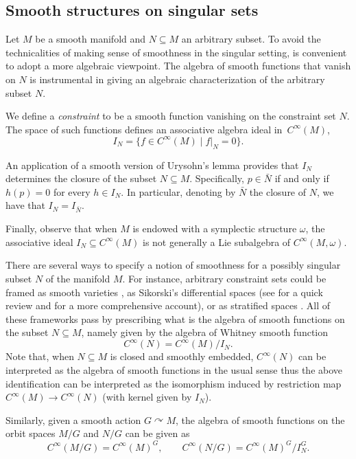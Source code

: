 \documentclass[pdftex]{sigma}
\numberwithin{equation}{section}
\DeclareMathOperator{\action}{\curvearrowright}
\renewcommand{\subset}{\subseteq}
\begin{document}
\subsection{Smooth structures on singular sets}%

Let $M$ be a smooth manifold and $N\subset M$ an arbitrary subset.
To avoid the technicalities of making sense of smoothness in the singular setting, is convenient to adopt a more algebraic viewpoint.
The algebra of smooth functions that vanish on $N$ is instrumental in giving an algebraic characterization of the arbitrary subset $N$.

\begin{Definition}\label{def:constraintideal}
	We define a \emph{constraint} to be a smooth function vanishing on the constraint set $N$.
	The space of such functions defines an associative algebra ideal in~$C^\infty(M)$,
	\[
		I_N	= 	\{
					f \in C^\infty(M)
				\mid
					f|_N = 0
			 	\}.
	\]
\end{Definition}

An application of a smooth version of Urysohn's lemma provides that $I_N$ determines the closure of the subset $N\subset M$.
Specifically, $p \in \bar{N}$ if and only if $h(p)=0$ for every $h \in I_N$.
In particular, denoting by $\bar{N}$ the closure of $N$, we have that $I_N=I_{\bar N}$.

Finally, observe that when $M$ is endowed with a symplectic structure $\omega$, the associative ideal $I_N\subset C^\infty(M)$ is not generally a Lie subalgebra of $C^\infty(M,\omega)$.

\begin{Remark}\label{rem:generalizedSmootheology}
	There are several ways to specify a notion of smoothness for a possibly singular subset $N$ of the manifold $M$.
For instance, arbitrary constraint sets could be framed as smooth varieties \cite[Section~6]{ArmsCushmanGotay91}, as Sikorski's differential spaces \cite{Sikorski72,Sikorski72a} (see \cite[Section~3]{CushmanSniatycki01} for a quick review and \cite{Stacey08} for a more comprehensive account), or as stratified spaces \cite{SjamaarLerman91}.
	All of these frameworks pass by prescribing what is the algebra of smooth functions on the subset $N\subset M$, namely given by the algebra of Whitney \cite{Whitney34} smooth function
	\[
	C^\infty(N) = C^\infty(M)/I_{N} .
	\]
	Note that, when $N\subset M$ is closed and smoothly embedded, $C^\infty(N)$ can be interpreted as the algebra of smooth functions in the usual sense thus the above identification can be interpreted as the isomorphism induced by restriction map $C^\infty(M)\to C^\infty(N)$ (with kernel given by $I_N$).
	
	Similarly, given a smooth action $G\action M$, the algebra of smooth functions on the orbit spaces $M/G$ and $N/G$ can be given as
\[
	 C^\infty(M/G)= C^\infty(M)^G , \qquad C^\infty(N/G)= C^\infty(M)^G / I_N^G .
\]
\end{Remark}
\end{document}
